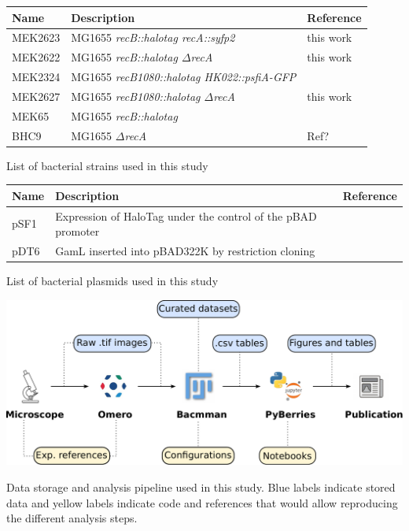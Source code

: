 \begin{supptable}[htbp]
    \centering
    \begin{tabular}{lll}
        \toprule
        Name & Description & Reference\\
        \midrule
        MEK2623 & MG1655 \textit{recB::halotag recA::syfp2} & this work\\
        MEK2622 & MG1655 \textit{recB::halotag $\Delta$recA} & this work \\ %
        MEK2324 & MG1655 \textit{recB1080::halotag HK022::psfiA-GFP} &  \\ %
        MEK2627 & MG1655 \textit{recB1080::halotag $\Delta$recA} & this work \\
        MEK65 & MG1655 \textit{recB::halotag} & \cite{Lepore2019a} \\
        BHC9 & MG1655 \textit{$\Delta$recA} & Ref? \\
        \bottomrule
    \end{tabular}
    \caption{List of bacterial strains used in this study}
    \label{SItab:strains}
\end{supptable}

\begin{supptable}[htbp]
    \centering
    \begin{tabular}{lll}
        \toprule
        Name & Description & Reference\\
        \midrule
        pSF1 & Expression of HaloTag under the control of the pBAD promoter & \cite{Lepore2019a} \\
        pDT6 & GamL inserted into pBAD322K by restriction cloning & \cite{Wilkinson2016} \\
        \bottomrule
    \end{tabular}
    \caption{List of bacterial plasmids used in this study}
    \label{SItab:plasmids}
\end{supptable}

\begin{suppfigure*}[htbp]
\begin{center}
\includegraphics[width=\textwidth]{SI_Figures/Data_analysis_workflow.pdf}
\end{center}
\caption{Data storage and analysis pipeline used in this study. Blue labels indicate stored data and yellow labels indicate code and references that would allow reproducing the different analysis steps.}
\label{SIFig:analysis_workflow}
\end{suppfigure*}

